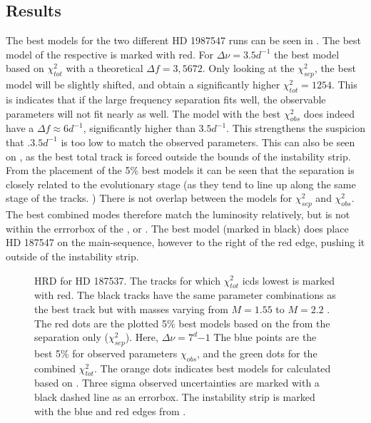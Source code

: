 \subsection{Results}
The best models for the two different HD 1987547 runs can be seen in . The best model of the respective \chis is marked with red. For $\Delta \nu=3.5 d^{-1}$ the best model based on $\chi_{tot}^2$ with a theoretical $\Delta f = 3,5672$. Only looking at the $\chi_{sep}^2$, the best model will be slightly shifted, and obtain a significantly higher $\chi_{tot}^2=1254$. This is indicates that if the large frequency separation fits well, the observable parameters will not fit nearly as well. The model with the best $\chi_{obs}^2$ does indeed have a $\Delta f \approx 6d^{-1}$, significantly higher than $3.5d^{-1}$. This strengthens the suspicion that $.3.5 d^{-1}$ is too low to match the observed parameters. This can also be seen on , as the best total track is forced outside the bounds of the instability strip.  From the placement of the 5\% best models it can be seen that the separation is closely related to the evolutionary stage (as they tend to line up along the same stage of the tracks. ) There is not overlap between the models for $\chi_{sep}^2$ and $\chi_{obs}^2$. The best combined modes therefore match the luminosity relatively, but is not within the errrorbox of the \teff, or \lum. The best model (marked in black) does place HD 187547 on the main-sequence, however to the right of the red edge, pushing it outside of the instability strip. 
\begin{figure}[htbp]
	\centering
	\caption{HRD for HD 187537. The tracks for which $\chi_{tot}^2$ icds lowest is marked with red. The black tracks have the same parameter combinations as the best track but with masses varying from $M=1.55$ to $M=2.2$ \msun. The red dots are the plotted 5\% best models based on the \chis from the separation only ($\chi_{sep}^2$).  Here, $\Delta \nu = 7^d{-1}$ The blue points are the best 5\% for observed parameters $\chi_{obs}$, and the green dots for the combined $\chi_{tot}^2$. The orange dots indicates best models for \chis calculated based on \lum. Three sigma observed uncertainties are marked with a black dashed line as an errorbox. The instability strip is marked with the blue and red edges from \citet{murphy2019gaia}.}
	\label{finalsuper}
\end{figure}
